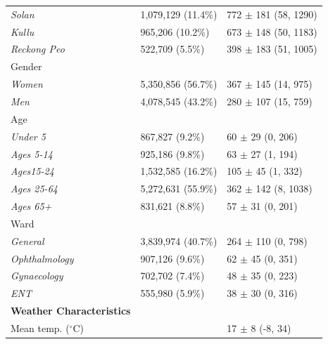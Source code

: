 \begin{longtable}[t]{p{5cm}p{4cm}p{5cm}}
\hspace{2em}\textit{Solan} & 1,079,129 (11.4\%) & 772 $\pm$ 181 (58, 1290)\\
\hspace{2em}\textit{Kullu} & 965,206 (10.2\%) & 673 $\pm$ 148 (50, 1183)\\
\hspace{2em}\textit{Reckong Peo} & 522,709 (5.5\%) & 398 $\pm$ 183 (51, 1005)\\
\hspace{1em}Gender &  & \\
\hspace{2em}\textit{Women} & 5,350,856 (56.7\%) & 367 $\pm$ 145 (14, 975)\\
\hspace{2em}\textit{Men} & 4,078,545 (43.2\%) & 280 $\pm$ 107 (15, 759)\\
\hspace{1em}Age &  & \\
\hspace{2em}\textit{Under 5} & 867,827 (9.2\%) & 60 $\pm$ 29 (0, 206)\\
\hspace{2em}\textit{Ages 5-14} & 925,186 (9.8\%) & 63 $\pm$ 27 (1, 194)\\
\hspace{2em}\textit{Ages15-24} & 1,532,585 (16.2\%) & 105 $\pm$ 45 (1, 332)\\
\hspace{2em}\textit{Ages 25-64} & 5,272,631 (55.9\%) & 362 $\pm$ 142 (8, 1038)\\
\hspace{2em}\textit{Ages 65+} & 831,621 (8.8\%) & 57 $\pm$ 31 (0, 201)\\
\hspace{1em}Ward &  & \\
\hspace{2em}\textit{General} & 3,839,974 (40.7\%) & 264 $\pm$ 110 (0, 798)\\
\hspace{2em}\textit{Ophthalmology} & 907,126 (9.6\%) & 62 $\pm$ 45 (0, 351)\\
\hspace{2em}\textit{Gynaecology} & 702,702 (7.4\%) & 48 $\pm$ 35 (0, 223)\\
\hspace{2em}\textit{ENT} & 555,980 (5.9\%) & 38 $\pm$ 30 (0, 316)\\
\textbf{Weather Characteristics} &  & \\
\hspace{1em}Mean temp. ($^\circ$C) &  & 17 $\pm$ 8 (-8, 34)\\

\end{longtable}

